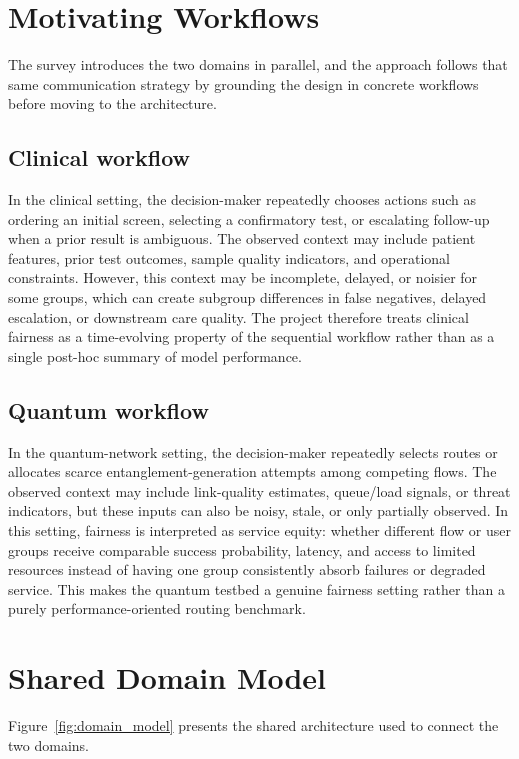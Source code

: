 \documentclass{IEEEtran}
\begin{document}
\section{Motivating Workflows}
The survey introduces the two domains in parallel, and the approach follows that same
communication strategy by grounding the design in concrete workflows before moving to the
architecture.

\subsection{Clinical workflow}
In the clinical setting, the decision-maker repeatedly chooses actions such as ordering an
initial screen, selecting a confirmatory test, or escalating follow-up when a prior result is
ambiguous. The observed context may include patient features, prior test outcomes, sample
quality indicators, and operational constraints. However, this context may be incomplete,
delayed, or noisier for some groups, which can create subgroup differences in false
negatives, delayed escalation, or downstream care quality. The project therefore treats
clinical fairness as a time-evolving property of the sequential workflow rather than as a
single post-hoc summary of model performance.

\subsection{Quantum workflow}
In the quantum-network setting, the decision-maker repeatedly selects routes or allocates
scarce entanglement-generation attempts among competing flows. The observed context may
include link-quality estimates, queue/load signals, or threat indicators, but these inputs can
also be noisy, stale, or only partially observed. In this setting, fairness is interpreted as
service equity: whether different flow or user groups receive comparable success
probability, latency, and access to limited resources instead of having one group
consistently absorb failures or degraded service. This makes the quantum testbed a genuine
fairness setting rather than a purely performance-oriented routing benchmark.

\section{Shared Domain Model}
Figure~\ref{fig:domain_model} presents the shared architecture used to connect the two
domains.
\end{document}
